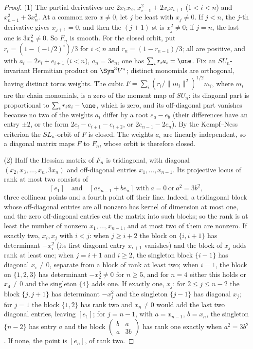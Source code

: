 \begin{proof}
(1) The partial derivatives are $2x_1x_2$, $x_{i-1}^2+2x_ix_{i+1}$
($1<i<n$) and $x_{n-1}^2+3x_n^2$. At a common zero $x\ne0$, let $j$ be least
with $x_j\ne0$. If $j<n$, the $j$-th derivative gives $x_{j+1}=0$, and then
the $(j+1)$-st is $x_j^2\ne0$; if $j=n$, the last one is $3x_n^2\ne0$. So
$F_n$ is smooth. For the closed orbit, put $r_i=(1-(-1/2)^i)/3$ for $i<n$ and
$r_n=(1-r_{n-1})/3$; all are positive, and with $a_i=2e_i+e_{i+1}$ ($i<n$),
$a_n=3e_n$, one has $\sum_ir_ia_i=\one$. Fix an $SU_n$-invariant Hermitian
product on $\Sym^3V^*$; distinct monomials are orthogonal, having distinct
torus weights. The cubic $F=\sum_i(r_i/\|m_i\|^2)^{1/2}m_i$, where $m_i$ are the
chain monomials, is a zero of the moment map of $SU_n$: its diagonal part is
proportional to $\sum_ir_ia_i-\one$, which is zero, and its off-diagonal part
vanishes because no two of the weights $a_i$ differ by a root $e_a-e_b$
(their differences have an entry $\pm2$, or the form $2e_i-e_{i+1}-e_{i+2}$, or
$2e_{n-1}-2e_n$). By the Kempf--Ness criterion \cite[Theorem 4, p.~1]{Losev}
the $SL_n$-orbit of $F$ is closed. The weights $a_i$ are linearly independent,
so a diagonal matrix maps $F$ to $F_n$, whose orbit is therefore closed.

(2) Half the Hessian matrix of $F_n$ is tridiagonal, with diagonal
$(x_2,x_3,\dots,x_n,3x_n)$ and off-diagonal entries $x_1,\dots,x_{n-1}$. Its
projective locus of rank at most two consists of
\begin{equation}\label{eq:hessianlocus}
 [e_1]\quad\text{and}\quad[ae_{n-1}+be_n]\ \text{with}\ a=0\ \text{or}\ a^2=3b^2 ,
\end{equation}
three collinear points and a fourth point off their line. Indeed, a tridiagonal
block whose off-diagonal entries are all nonzero has kernel of dimension at
most one, and the zero off-diagonal entries cut the matrix into such blocks; so
the rank is at least the number of nonzero $x_1,\dots,x_{n-1}$, and at most two
of them are nonzero. If exactly two, $x_i,x_j$ with $i<j$: when $j\ge i+2$ the
block on $\{i,i+1\}$ has determinant $-x_i^2$ (its first diagonal entry
$x_{i+1}$ vanishes) and the block of $x_j$ adds rank at least one; when $j=i+1$
and $i\ge2$, the singleton block $\{i-1\}$ has diagonal $x_i\ne0$, separate
from a block of rank at least two; when $i=1$, the block on $\{1,2,3\}$ has
determinant $-x_2^3\ne0$ for $n\ge5$, and for $n=4$ either this holds or
$x_4\ne0$ and the singleton $\{4\}$ adds one. If exactly one, $x_j$: for $2\le
j\le n-2$ the block $\{j,j+1\}$ has determinant $-x_j^2$ and the singleton
$\{j-1\}$ has diagonal $x_j$; for $j=1$ the block $\{1,2\}$ has rank two and
$x_n\ne0$ would add the last two diagonal entries, leaving $[e_1]$; for
$j=n-1$, with $a=x_{n-1}$, $b=x_n$, the singleton $\{n-2\}$ has entry $a$ and
the block $\left(\begin{smallmatrix}b&a\\a&3b\end{smallmatrix}\right)$ has rank
one exactly when $a^2=3b^2$. If none, the point is $[e_n]$, of rank two.


\end{proof}
